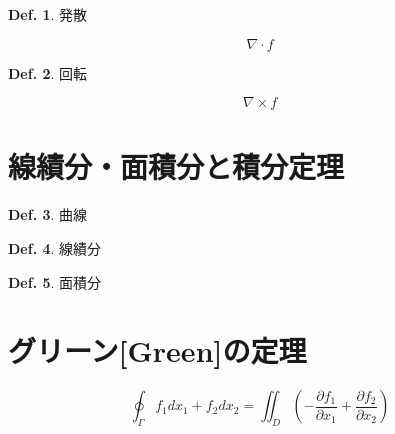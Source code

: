 \documentclass[a4paper,10pt,report]{amsart}
\theoremstyle{plain}
\theoremstyle{definition}
\newtheorem{defn}{Def.}[section]
\theoremstyle{remark}
\begin{document}
    \begin{leftbar}
        \begin{defn}発散\par
            \begin{equation}
                \nabla{}\cdot{}f
            \end{equation}
        \end{defn}
    \end{leftbar}
    \begin{leftbar}
        \begin{defn}回転\par
            \begin{equation}
                \nabla{}\times{}f
            \end{equation}
        \end{defn}
    \end{leftbar}

    \section{線績分・面積分と積分定理}
    \begin{leftbar}
        \begin{defn}曲線\par
            
        \end{defn}
    \end{leftbar}
    \begin{leftbar}
        \begin{defn}線績分\par
            
        \end{defn}
    \end{leftbar}
    \begin{leftbar}
        \begin{defn}面積分\par
            
        \end{defn}
    \end{leftbar}
    \section{グリーン[Green]の定理}
    \begin{equation}
        \oint_{\Gamma}f_{1}dx_{1}+f_{2}dx_{2}=\iint_{D}\left(-\frac{\partial f_{1}}{\partial x_{1}}+\frac{\partial f_{2}}{\partial x_{2}}\right )
    \end{equation}
\end{document}
